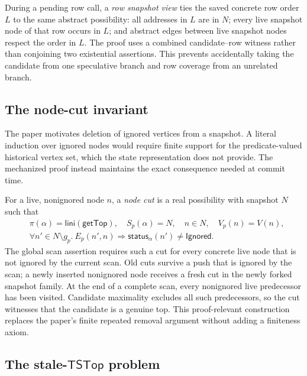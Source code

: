 \documentclass[11pt]{article}
\theoremstyle{definition}
\theoremstyle{remark}
\newcommand{\topts}{\mathsf{TSTop}}
\newcommand{\Lini}{\mathsf{lini}}
\newcommand{\GetTop}{\mathsf{getTop}}
\begin{document}
During a pending row call, a \emph{row snapshot view} ties the saved concrete
row order \(L\) to the same abstract possibility: all addresses in \(L\) are
in \(N\); every live snapshot node of that row occurs in \(L\); and abstract
edges between live snapshot nodes respect the order in \(L\).  The proof uses
a combined candidate--row witness rather than conjoining two existential
assertions.  This prevents accidentally taking the candidate from one
speculative branch and row coverage from an unrelated branch.

\subsection{The node-cut invariant}

The paper motivates deletion of ignored vertices from a snapshot.  A literal
induction over ignored nodes would require finite support for the
predicate-valued historical vertex set, which the state representation does
not provide.  The mechanized proof instead maintains the exact consequence
needed at commit time.

For a live, nonignored node \(n\), a \emph{node cut} is a real possibility
with snapshot \(N\) such that
\begin{equation}
\begin{split}
&\pi(\alpha)=\Lini(\GetTop),\quad S_p(\alpha)=N,
  \quad n\in N,\quad V_p(n)=V(n),\\
&\forall n'\in N\setminus g_p.\
  E_p(n',n)\Longrightarrow
  \mathsf{status}_{\alpha}(n')\ne\mathsf{Ignored}.
\end{split}
\tag{Cut}
\end{equation}
The global scan assertion requires such a cut for every concrete live node
that is not ignored by the current scan.  Old cuts survive a push that is
ignored by the scan; a newly inserted nonignored node receives a fresh cut in
the newly forked snapshot family.  At the end of a complete scan, every
nonignored live predecessor has been visited.  Candidate maximality excludes
all such predecessors, so the cut witnesses that the candidate is a genuine
top.  This proof-relevant construction replaces the paper's finite repeated
removal argument without adding a finiteness axiom.

\subsection{The stale-\texorpdfstring{\(\topts\)}{TSTop} problem}
\end{document}
